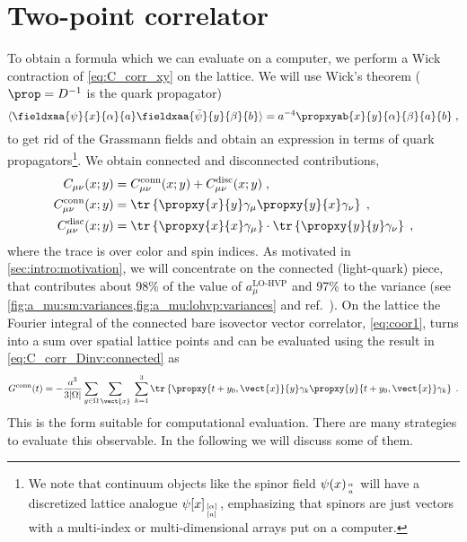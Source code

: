\section{Two-point correlator}
\label{sec:2pt-corr}

To obtain a formula which we can evaluate on a computer, we perform a Wick contraction of \cref{eq:C_corr_xy} on the lattice.
We will use Wick's theorem ($\prop = D^{-1}$ is the quark propagator)
\begin{equation}
\langle \fieldxaa{\psi}{x}{\alpha}{a} \fieldxaa{\bar{\psi}}{y}{\beta}{b} \rangle =
a^{-4} \propxyab{x}{y}{\alpha}{\beta}{a}{b} \;,
\end{equation}
to get rid of the Grassmann fields and obtain an expression in terms of quark propagators\footnote{We note that continuum objects like the spinor field $\psi(x)_{\alpha \atop a}$ will have a discretized lattice analogue $\psi[x]_{[\alpha] \atop [a]}$, emphasizing that spinors are just vectors with a multi-index or multi-dimensional arrays put on a computer.}.
We obtain connected and disconnected contributions,
\begin{align}
C_{\mu \nu}(x;y) &= C_{\mu \nu}^{\text{conn}}(x;y) + C_{\mu \nu}^{\text{disc}}(x;y) \;, \\
C_{\mu \nu}^{\text{conn}}(x;y) &=
\tr \left\{
  \propxy{x}{y} \gamma_{\mu} \propxy{y}{x} \gamma_{\nu}
\right\} \;, \label{eq:C_corr_Dinv:connected} \\
C_{\mu \nu}^{\text{disc}}(x;y) &=
\tr \left\{ \propxy{x}{x} \gamma_{\mu} \right\}
\cdot
\tr \left\{ \propxy{y}{y} \gamma_{\nu} \right\} \;,
\end{align}
where the trace is over color and spin indices.
As motivated in \cref{sec:intro:motivation}, we will concentrate on the connected (light-quark) piece, that contributes about 98\% of the value of $a_{\mu}^{\text{LO-HVP}}$ and 97\% to the variance (see \cref{fig:a_mu:sm:variances,fig:a_mu:lohvp:variances} and ref.~\cite{snowmass:2025}).
On the lattice the Fourier integral of the connected bare isovector vector correlator, \cref{eq:coor1}, turns into a sum over spatial lattice points and can be evaluated using the result in \cref{eq:C_corr_Dinv:connected} as
\begin{equation} \label{eq:G:corr:connected}
G^{\text{conn}}(t) =
- \frac{a^{3}}{3 \lvert \Omega \rvert}
\sum_{y \in \Omega}
\sum_{\vect{x}} \;
\sum_{k=1}^{3}
\tr \left\{
  \propxy{t+y_0, \vect{x}}{y} \gamma_k \propxy{y}{t+y_0, \vect{x}} \gamma_k
\right\} \;.
\end{equation}
This is the form suitable for computational evaluation.
There are many strategies to evaluate this observable.
In the following we will discuss some of them.

